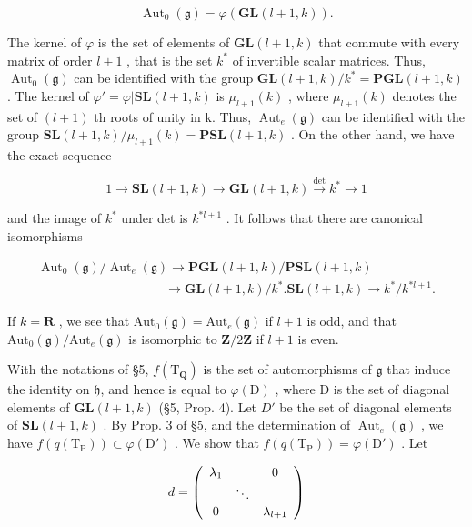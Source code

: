 \[
\operatorname{Aut} _ {0} (\mathfrak {g}) = \varphi (\mathbf {G L} (l + 1, k)).
\]

The kernel of \(\varphi\) is the set of elements of \(\mathbf{GL}(l+1,k)\) that commute with every matrix of order \(l+1\) , that is the set \(k^{*}\) of invertible scalar matrices. Thus, \(\operatorname{Aut}_{0}(\mathfrak{g})\) can be identified with the group \(\mathbf{GL}(l+1,k)/k^{*}=\mathbf{PGL}(l+1,k)\) . The kernel of \(\varphi'=\varphi|\mathbf{SL}(l+1,k)\) is \(\mu_{l+1}(k)\) , where \(\mu_{l+1}(k)\) denotes the set of \((l+1)\) th roots of unity in k. Thus, \(\operatorname{Aut}_{e}(\mathfrak{g})\) can be identified with the group \(\mathbf{SL}(l+1,k)/\mu_{l+1}(k)=\mathbf{PSL}(l+1,k)\) . On the other hand, we have the exact sequence

\[
1 \longrightarrow \mathbf {S L} (l + 1, k) \longrightarrow \mathbf {G L} (l + 1, k) \stackrel {\det} {\longrightarrow} k ^ {*} \longrightarrow 1
\]

and the image of \(k^*\) under det is \(k^{*l + 1}\) . It follows that there are canonical isomorphisms

\[
\begin{array}{c} \operatorname{Aut} _ {0} (\mathfrak {g}) / \operatorname{Aut} _ {e} (\mathfrak {g}) \longrightarrow \mathbf {P G L} (l + 1, k) / \mathbf {P S L} (l + 1, k) \\ \qquad \qquad \qquad \qquad \qquad \longrightarrow \mathbf {G L} (l + 1, k) / k ^ {*}. \mathbf {S L} (l + 1, k) \longrightarrow k ^ {*} / k ^ {*   l + 1}. \end{array}
\]

If \(k = \mathbf{R}\) , we see that \(\mathrm{Aut}_0(\mathfrak{g}) = \mathrm{Aut}_e(\mathfrak{g})\) if \(l + 1\) is odd, and that \(\mathrm{Aut}_0(\mathfrak{g}) / \mathrm{Aut}_e(\mathfrak{g})\) is isomorphic to \(\mathbf{Z}/2\mathbf{Z}\) if \(l + 1\) is even.

With the notations of §5, \(f(\mathrm{T}_{\mathbf{Q}})\) is the set of automorphisms of \(\mathfrak{g}\) that induce the identity on \(\mathfrak{h}\), and hence is equal to \(\varphi(\mathrm{D})\) , where D is the set of diagonal elements of \(\mathbf{GL}(l+1,k)\) (§5, Prop. 4). Let \(D'\) be the set of diagonal elements of \(\mathbf{SL}(l+1,k)\) . By Prop. 3 of §5, and the determination of \(\operatorname{Aut}_{e}(\mathfrak{g})\) , we have \(f(q(\mathrm{T}_{\mathrm{P}})) \subset \varphi(\mathrm{D}')\) . We show that \(f(q(\mathrm{T}_{\mathrm{P}})) = \varphi(\mathrm{D}')\) . Let

\[
d = \left( \begin{array}{c c c} \lambda_ {1} & & 0 \\ & \ddots & \\ 0 & & \lambda_ {l + 1} \end{array} \right)
\]

